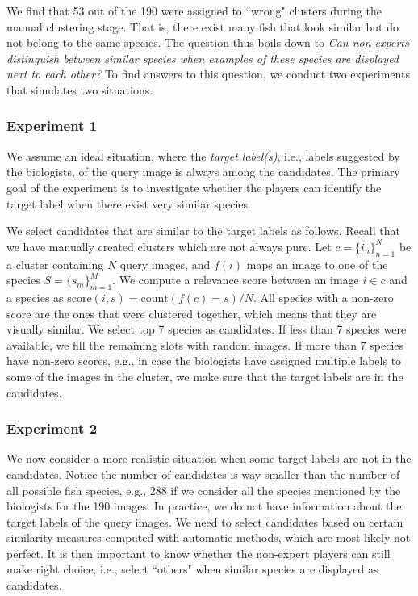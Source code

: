 We find that 53 out of the 190 were assigned to ``wrong" clusters during
the manual clustering stage.  That is, there exist many fish that look similar but do not belong to the same species. 
The question thus boils down to
\emph{Can non-experts distinguish between similar species when examples of these species are displayed
next to each other?}
%
To find answers to this question, we conduct two experiments that simulates two situations. 
%

\subsubsection{Experiment 1}
We assume an ideal situation, where the \emph{target label(s)}, i.e., labels suggested by the biologists,  
of the query image is always among the candidates.
The primary goal of the experiment is to investigate whether the players can identify
the target label when there exist very similar species.

We select candidates that are similar to the target labels as follows.
Recall that we have manually created clusters which are not always pure. 
Let $c=\{i_n\}_{n=1}^N$ be a cluster containing $N$ query images, and $f(i)$ maps an image
to one of the species $S=\{s_m\}_{m=1}^M$.
We compute a relevance score between an image $i \in c$ and a species as
$\text{score}(i, s) = \text{count}(f(c) = s)/N$.
All species with a non-zero score are the ones that were clustered together, which means
that they are visually similar. We select top 7 species as candidates.
If less than 7 species were available, we fill the remaining slots with random images.
If more than 7 species have non-zero scores, e.g., in case
the biologists have assigned multiple labels to some of the images in the cluster, we make sure that
the target labels are in the candidates.
%
%
\subsubsection{Experiment 2}
We now consider a more realistic situation when some target labels are not in the candidates. 
%
Notice the number of candidates is way smaller than the number of
all possible fish species, e.g., 288 if we consider all the species mentioned by the biologists for the 190 images.
%
In practice, we do not have information about the target labels of the query images.
We need to select candidates based on certain similarity measures computed with automatic
methods, which are most likely not perfect. 
It is then important to know whether the non-expert players can still make right 
choice, i.e., select ``others" when similar species are displayed as candidates. 

